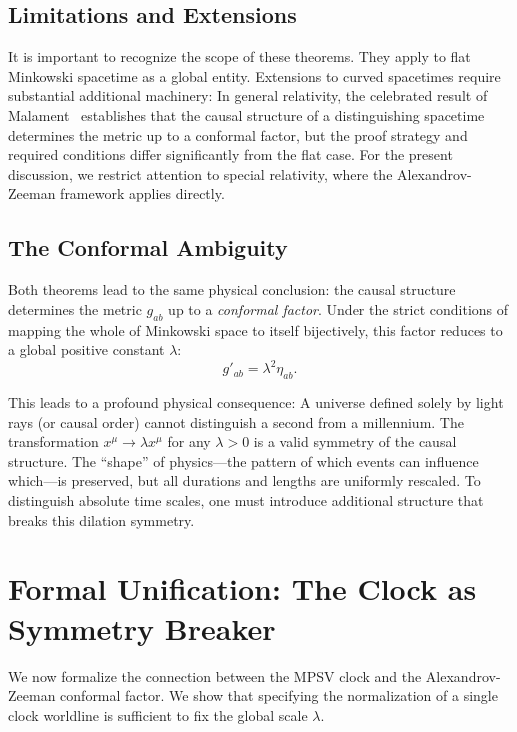\documentclass[aps,prd,twocolumn,nofootinbib,superscriptaddress]{revtex4-2}
\begin{document}
\subsection{Limitations and Extensions}

It is important to recognize the scope of these theorems. They apply to flat Minkowski spacetime as a global entity. Extensions to curved spacetimes require substantial additional machinery: In general relativity, the celebrated result of Malament~\cite{Malament-1977} establishes that the causal structure of a distinguishing spacetime determines the metric up to a conformal factor, but the proof strategy and required conditions differ significantly from the flat case. For the present discussion, we restrict attention to special relativity, where the Alexandrov-Zeeman framework applies directly.

\subsection{The Conformal Ambiguity}

Both theorems lead to the same physical conclusion: the causal structure determines the metric $g_{ab}$ up to a \emph{conformal factor}. Under the strict conditions of mapping the whole of Minkowski space to itself bijectively, this factor reduces to a global positive constant $\lambda$:
\begin{equation}
    g'_{ab} = \lambda^2 \eta_{ab}.
\end{equation}

This leads to a profound physical consequence: A universe defined solely by light rays (or causal order) cannot distinguish a second from a millennium. The transformation $x^\mu \to \lambda x^\mu$ for any $\lambda > 0$ is a valid symmetry of the causal structure. The ``shape'' of physics---the pattern of which events can influence which---is preserved, but all durations and lengths are uniformly rescaled. To distinguish absolute time scales, one must introduce additional structure that breaks this dilation symmetry.

\section{Formal Unification: The Clock as Symmetry Breaker}
\label{sec:Formal}

We now formalize the connection between the MPSV clock and the Alexandrov-Zeeman conformal factor. We show that specifying the normalization of a single clock worldline is sufficient to fix the global scale $\lambda$.
\end{document}
